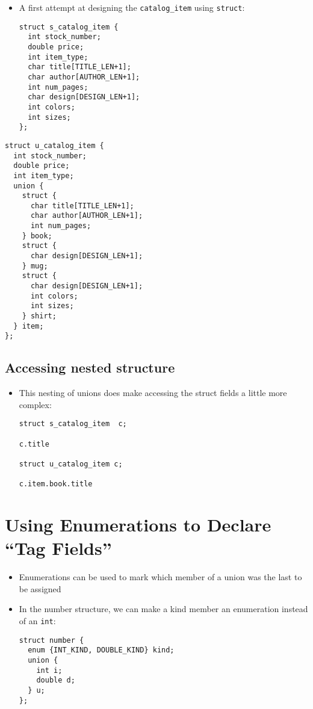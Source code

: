 \documentclass{article}
\begin{document}
\begin{itemize}
\item A first attempt at designing the \verb!catalog_item! using \verb!struct!:
\begin{verbatim}
struct s_catalog_item {
  int stock_number;
  double price;
  int item_type;
  char title[TITLE_LEN+1];
  char author[AUTHOR_LEN+1];
  int num_pages;
  char design[DESIGN_LEN+1];
  int colors;
  int sizes;
};
\end{verbatim}
\end{itemize}



\begin{verbatim}
struct u_catalog_item {
  int stock_number;
  double price;
  int item_type;
  union {
    struct {
      char title[TITLE_LEN+1];
      char author[AUTHOR_LEN+1];
      int num_pages;
    } book;
    struct {
      char design[DESIGN_LEN+1];
    } mug;
    struct {
      char design[DESIGN_LEN+1];
      int colors;
      int sizes;
    } shirt;
  } item;
};
\end{verbatim}



\subsection{Accessing nested structure}
\begin{itemize}
\item This nesting of unions does make accessing the struct fields a little more complex: 
\begin{verbatim}
struct s_catalog_item  c; 

c.title

struct u_catalog_item c;

c.item.book.title
\end{verbatim}
\end{itemize}



\section{Using Enumerations to Declare ``Tag Fields''}
\begin{itemize}
\item Enumerations can be used to mark which member of a union was the last to be assigned

\item In the number structure, we can make a kind member an enumeration instead of an \verb!int!:
\begin{verbatim}
struct number {
  enum {INT_KIND, DOUBLE_KIND} kind;
  union {
    int i;
    double d;
  } u;
};
\end{verbatim}
\end{itemize}
\end{document}
